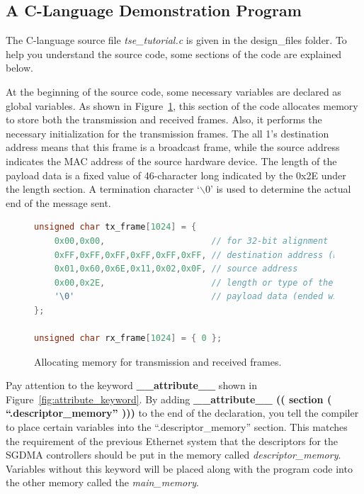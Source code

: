\documentclass[11pt, twoside, pdftex]{article}
\begin{document}
\subsection{A C-Language Demonstration Program}
The C-language source file {\it tse\_tutorial.c} is given in the design\_files folder. To help you understand the source code, some sections of the code are explained below.

At the beginning of the source code, some necessary variables are declared as global variables. As shown in Figure~\ref{fig:allocate_packets}, this section of the code allocates memory to store both the transmission and received frames. Also, it performs the necessary initialization for the transmission frames. The all 1's destination address means that this frame is a broadcast frame, while the source address indicates the MAC address of the source hardware device. The length of the payload data is a fixed value of 46-character long indicated by the 0x2E under the length section. A termination character `$\backslash$0' is used to determine the actual end of the message sent. 

\begin{figure}[H]
	\begin{lstlisting}[language=C]
unsigned char tx_frame[1024] = {
    0x00,0x00,                     // for 32-bit alignment
    0xFF,0xFF,0xFF,0xFF,0xFF,0xFF, // destination address (broadcast)
    0x01,0x60,0x6E,0x11,0x02,0x0F, // source address
    0x00,0x2E,                     // length or type of the payload data
    '\0'                           // payload data (ended with termination char)
};

unsigned char rx_frame[1024] = { 0 };
	\end{lstlisting}
	\caption{Allocating memory for transmission and received frames.}
	\label{fig:allocate_packets}
\end{figure}

Pay attention to the keyword {\bf \_\_attribute\_\_} shown in Figure~\ref{fig:attribute_keyword}. By adding {\bf \_\_attribute\_\_ (( section ( ``.descriptor\_memory'' )))} to the end of the declaration, you tell the compiler to place certain variables into the ``.descriptor\_memory'' section. This matches the requirement of the previous Ethernet system that the descriptors for the SGDMA controllers should be put in the memory called {\it descriptor\_memory}. Variables without this keyword will be placed along with the program code into the other memory called the {\it main\_memory}. 
\end{document}

